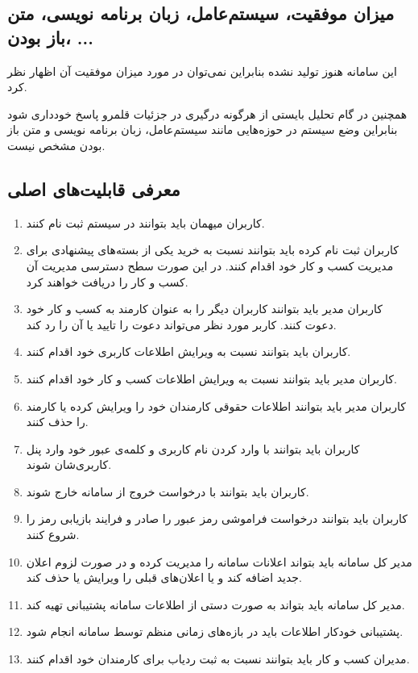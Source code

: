 \subsection{میزان موفقیت، سیستم‌عامل، زبان برنامه نویسی، متن باز بودن، ...}
این سامانه هنوز تولید نشده بنابر‌این نمی‌توان در مورد میزان موفقیت آن اظهار نظر کرد.

همچنین در گام تحلیل بایستی از هرگونه درگیری در جزئیات قلمرو پاسخ  خودداری شود بنابراین وضع سیستم در حوزه‌هایی مانند سیستم‌عامل، زبان برنامه نویسی و متن باز بودن مشخص نیست.


\subsection{معرفی قابلیت‌های اصلی}

\begin{enumerate}
\item کاربران میهمان باید بتوانند در سیستم ثبت نام کنند.
\item کاربران ثبت نام کرده باید بتوانند نسبت به خرید یکی از بسته‌های پیشنهادی برای مدیریت کسب و کار خود اقدام کنند. در این صورت سطح دسترسی مدیریت آن کسب و کار را دریافت خواهند کرد.
\item کاربران مدیر باید بتوانند کاربران دیگر را به عنوان کارمند به کسب و کار خود دعوت کنند. کاربر مورد نظر می‌تواند دعوت را تایید یا آن را رد کند.
\item کاربران باید بتوانند نسبت به ویرایش اطلاعات کاربری خود اقدام کنند.
\item کاربران مدیر باید بتوانند نسبت به ویرایش اطلاعات کسب و کار خود اقدام کنند.
\item کاربران مدیر باید بتوانند اطلاعات حقوقی کارمندان خود را ویرایش کرده یا کارمند را حذف کنند.
\item کاربران باید بتوانند با وارد کردن نام کاربری و کلمه‌ی عبور خود وارد پنل کاربری‌شان شوند.
\item کاربران باید بتوانند با درخواست خروج از سامانه خارج شوند.
\item کاربران باید بتوانند درخواست فراموشی رمز عبور را صادر و فرایند بازیابی رمز را شروع کنند.
\item مدیر کل سامانه باید بتواند اعلانات سامانه را مدیریت کرده و در صورت لزوم اعلان جدید اضافه کند و یا اعلان‌های قبلی را ویرایش یا حذف کند.
\item مدیر کل سامانه باید بتواند به صورت دستی از اطلاعات سامانه پشتیبانی تهیه کند.
\item پشتیبانی خودکار اطلاعات باید در بازه‌های زمانی منظم توسط سامانه انجام شود.
\item مدیران کسب و کار باید بتوانند نسبت به ثبت ردیاب برای کارمندان  خود اقدام کنند.

\end{enumerate}
